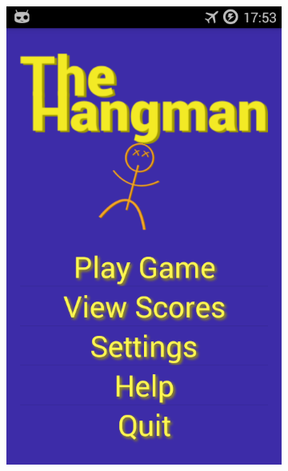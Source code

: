 \begin{figure}[ht]
\begin{subfigure}[b]{0.25\textwidth}
        \includegraphics[width=\textwidth]{./img/gui/a2.png}
    \end{subfigure}
    \begin{subfigure}[b]{0.25\textwidth}

\end{subfigure}
\end{figure}
